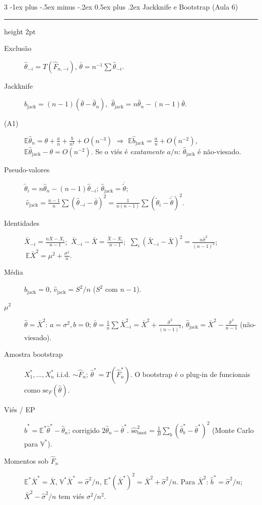 \documentclass[10pt,landscape]{article}
\makeatletter
\newcommand{\E}{\mathbb{E}}
\newcommand{\V}{\mathbb{V}}
\newcommand{\Fn}{\hat{F}_n}
\renewcommand{\section}{\@startsection{section}{1}{0mm}%
                                {-1ex plus -.5ex minus -.2ex}%
                                {0.5ex plus .2ex}%
                                {\normalfont\small\bfseries}}
\newcommand{\secrule}{\smallskip \hrule height 2pt \smallskip}
\makeatother
\begin{document}
\begin{multicols}{3}
\section{Jackknife e Bootstrap (Aula 6)}\secrule
\begin{description}
  \item[Exclusão] $\hat\theta_{-i}=T(\hat F_{n,-i})$, $\bar\theta=n^{-1}\sum\hat\theta_{-i}$.
  \item[Jackknife] $\hat b_{\textrm{jack}}=(n-1)(\bar\theta-\hat\theta_n)$, $\ \hat\theta_{\textrm{jack}}=n\hat\theta_n-(n-1)\bar\theta$.
  \item[(A1)] $\E\hat\theta_n=\theta+\frac an+\frac b{n^2}+O(n^{-3})$ $\Rightarrow$ $\E\hat b_{\textrm{jack}}=\frac an+O(n^{-2})$, $\E\hat\theta_{\textrm{jack}}-\theta=O(n^{-2})$. Se o viés é \emph{exatamente} $a/n$: $\hat\theta_{\textrm{jack}}$ é não-viesado.
  \item[Pseudo-valores] $\tilde\theta_i=n\hat\theta_n-(n-1)\hat\theta_{-i}$; $\hat\theta_{\textrm{jack}}=\overline{\tilde\theta}$; $\ \hat v_{\textrm{jack}}=\frac{n-1}n\sum(\hat\theta_{-i}-\bar\theta)^2=\frac1{n(n-1)}\sum(\tilde\theta_i-\overline{\tilde\theta})^2$.
  \item[Identidades] $\bar X_{-i}=\frac{n\bar X-X_i}{n-1}$; $\ \bar X_{-i}-\bar X=\frac{\bar X-X_i}{n-1}$; $\ \sum_i(\bar X_{-i}-\bar X)^2=\frac{n\hat\sigma^2}{(n-1)^2}$; $\ \E\bar X^2=\mu^2+\frac{\sigma^2}n$.
  \item[Média] $\hat b_{\textrm{jack}}=0$, $\hat v_{\textrm{jack}}=S^2/n$ ($S^2$ com $n-1$).
  \item[$\mu^2$] $\hat\theta=\bar X^2$: $a=\sigma^2,b=0$; $\bar\theta=\frac1n\sum\bar X_{-i}^2=\bar X^2+\frac{\hat\sigma^2}{(n-1)^2}$, $\hat\theta_{\textrm{jack}}=\bar X^2-\frac{\hat\sigma^2}{n-1}$ (não-viesado).
\end{description}
\begin{description}
  \item[Amostra bootstrap] $X_1^*,\dots,X_n^*$ i.i.d. $\sim\Fn$; $\hat\theta^*=T(\Fn^*)$. O bootstrap é o plug-in de funcionais como $\textrm{se}_F(\hat\theta)$.
  \item[Viés / EP] $\hat b^*=\E^*\hat\theta^*-\hat\theta_n$; corrigido $2\hat\theta_n-\bar\theta^*$. $\hat{\textrm{se}}^2_{\textrm{boot}}=\frac1B\sum_b(\hat\theta^*_b-\bar\theta^*)^2$ (Monte Carlo para $\V^*$).
  \item[Momentos sob $\Fn$] $\E^*\bar X^*=\bar X$, $\V^*\bar X^*=\hat\sigma^2/n$, $\E^*(\bar X^*)^2=\bar X^2+\hat\sigma^2/n$. Para $\bar X^2$: $\hat b^*=\hat\sigma^2/n$; $\bar X^2-\hat\sigma^2/n$ tem viés $\sigma^2/n^2$.

\end{description}
\end{multicols}
\end{document}
